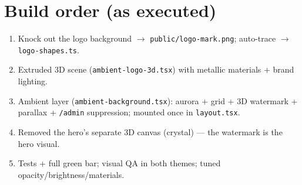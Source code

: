 \documentclass[11pt,a4paper]{article}
\begin{document}
\section{Build order (as executed)}
\begin{enumerate}
  \item Knock out the logo background $\rightarrow$ \texttt{public/logo-mark.png}; auto-trace
        $\rightarrow$ \texttt{logo-shapes.ts}.
  \item Extruded 3D scene (\texttt{ambient-logo-3d.tsx}) with metallic materials + brand lighting.
  \item Ambient layer (\texttt{ambient-background.tsx}): aurora + grid + 3D watermark +
        parallax + \texttt{/admin} suppression; mounted once in \texttt{layout.tsx}.
  \item Removed the hero's separate 3D canvas (crystal) --- the watermark is the hero visual.
  \item Tests + full green bar; visual QA in both themes; tuned opacity/brightness/materials.
\end{enumerate}
\end{document}
